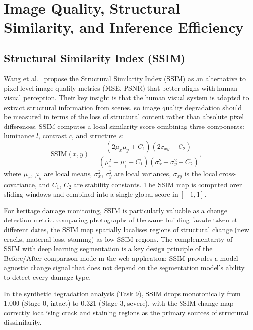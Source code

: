 \documentclass[12pt,a4paper]{article}
\begin{document}
\section{Image Quality, Structural Similarity, and Inference Efficiency}
\label{surv:sec:quality}

\subsection{Structural Similarity Index (SSIM)}

Wang et al.~\cite{surv:wang2004ssim} propose the Structural Similarity Index (SSIM) as an alternative to pixel-level image quality metrics (MSE, PSNR) that better aligns with human visual perception. Their key insight is that the human visual system is adapted to extract structural information from scenes, so image quality degradation should be measured in terms of the loss of structural content rather than absolute pixel differences. SSIM computes a local similarity score combining three components: luminance $l$, contrast $c$, and structure $s$:
\begin{equation}
  \text{SSIM}(x,y) = \frac{(2\mu_x\mu_y + C_1)(2\sigma_{xy} + C_2)}{(\mu_x^2 + \mu_y^2 + C_1)(\sigma_x^2 + \sigma_y^2 + C_2)},
\end{equation}
where $\mu_x$, $\mu_y$ are local means, $\sigma_x^2$, $\sigma_y^2$ are local variances, $\sigma_{xy}$ is the local cross-covariance, and $C_1$, $C_2$ are stability constants. The SSIM map is computed over sliding windows and combined into a single global score in $[-1, 1]$.

For heritage damage monitoring, SSIM is particularly valuable as a change detection metric: comparing photographs of the same building facade taken at different dates, the SSIM map spatially localises regions of structural change (new cracks, material loss, staining) as low-SSIM regions. The complementarity of SSIM with deep learning segmentation is a key design principle of the Before/After comparison mode in the web application: SSIM provides a model-agnostic change signal that does not depend on the segmentation model's ability to detect every damage type.

In the synthetic degradation analysis (Task 9), SSIM drops monotonically from 1.000 (Stage 0, intact) to 0.321 (Stage 3, severe), with the SSIM change map correctly localising crack and staining regions as the primary sources of structural dissimilarity.
\end{document}
